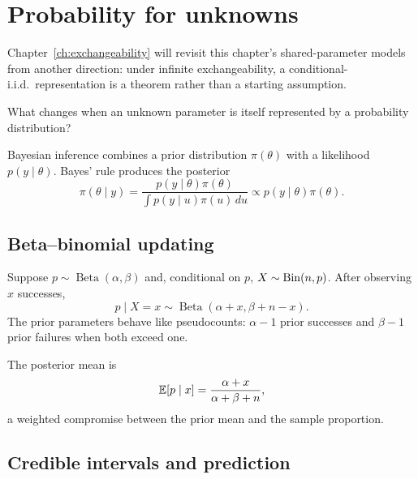 \chapter{Probability for unknowns}

Chapter~\ref{ch:exchangeability} will revisit this chapter's shared-parameter models from another direction: under infinite exchangeability, a conditional-i.i.d.\ representation is a theorem rather than a starting assumption.

\begin{question}
What changes when an unknown parameter is itself represented by a probability distribution?
\end{question}

Bayesian inference combines a prior distribution $\pi(\theta)$ with a likelihood $p(y\mid\theta)$. Bayes' rule produces the posterior
\[
\pi(\theta\mid y)=
\frac{p(y\mid\theta)\pi(\theta)}{\int p(y\mid u)\pi(u)\,du}
\propto p(y\mid\theta)\pi(\theta).
\]

\section{Beta--binomial updating}

Suppose $p\sim\operatorname{Beta}(\alpha,\beta)$ and, conditional on $p$, $X\sim\operatorname{Bin}(n,p)$. After observing $x$ successes,
\[
p\mid X=x\sim\operatorname{Beta}(\alpha+x,\beta+n-x).
\]
The prior parameters behave like pseudocounts: $\alpha-1$ prior successes and $\beta-1$ prior failures when both exceed one.

The posterior mean is
\[
\mathbb E[p\mid x]=\frac{\alpha+x}{\alpha+\beta+n},
\]
a weighted compromise between the prior mean and the sample proportion.

\begin{center}
\end{center}

\section{Credible intervals and prediction}

